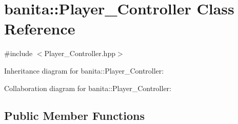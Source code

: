 \hypertarget{classbanita_1_1_player___controller}{}\section{banita\+::Player\+\_\+\+Controller Class Reference}
\label{classbanita_1_1_player___controller}


{\ttfamily \#include $<$Player\+\_\+\+Controller.\+hpp$>$}



Inheritance diagram for banita\+::Player\+\_\+\+Controller\+:


Collaboration diagram for banita\+::Player\+\_\+\+Controller\+:
\subsection*{Public Member Functions}
